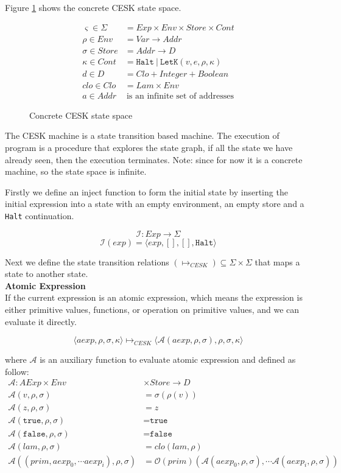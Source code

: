 \documentclass[paper=a4, fontsize=11pt]{scrartcl} %
\numberwithin{equation}{section} %
\numberwithin{figure}{section} %
\numberwithin{table}{section} %
\begin{document}
Figure \ref{fig:concretecesk} shows the concrete CESK state space.

\begin{figure}[h!]
\begin{align*}
\varsigma \in \Sigma & = Exp \times Env \times Store \times Cont \\
\rho \in Env & = Var \rightarrow Addr \\
\sigma \in Store & = Addr \rightarrow D \\
\kappa \in Cont & = \texttt{Halt} ~|~ \texttt{LetK}(v,e,\rho,\kappa) \\
d \in D & = Clo + Integer + Boolean \\
clo \in Clo & = Lam \times Env \\
a \in Addr & ~ \mbox{is an infinite set of addresses}
\end{align*}
\caption{Concrete CESK state space}
\label{fig:concretecesk}
\end{figure}

The CESK machine is a state transition based machine. The execution of program is a procedure that explores the state graph, if all the state we have already seen, then the execution terminates. Note: since for now it is a concrete machine, so the state space is infinite.

Firstly we define an inject function to form the initial state by inserting the initial expression into a state with an empty environment, an empty store and a \texttt{Halt} continuation.

$$ \mathcal{I} : Exp \rightarrow \Sigma $$
$$ \mathcal{I}(exp) = \langle exp, [], [], \texttt{Halt} \rangle $$

Next we define the state transition relations $(\longmapsto_{CESK}) \subseteq \Sigma \times \Sigma$ that maps a state to another state. \\

\textbf{Atomic Expression}\\
If the current expression is an atomic expression, which means the expression is either primitive values, functions, or operation on primitive values, and we can evaluate it directly.

$$ \langle aexp, \rho, \sigma, \kappa \rangle \longmapsto_{CESK} \langle \mathcal{A}(aexp, \rho, \sigma), \rho, \sigma, \kappa \rangle $$

where $\mathcal{A}$ is an auxiliary function to evaluate atomic expression and defined as follow:
\begin{align*}
\mathcal{A} : AExp \times Env & \times Store \rightarrow D \\
\mathcal{A}(v, \rho, \sigma) & = \sigma(\rho(v)) \\
\mathcal{A}(z, \rho, \sigma) & = z \\
\mathcal{A}(\texttt{true}, \rho, \sigma) & = \texttt{true} \\
\mathcal{A}(\texttt{false}, \rho, \sigma) & = \texttt{false} \\
\mathcal{A}(lam, \rho, \sigma) & = clo(lam, \rho)  \\
\mathcal{A}((prim, aexp_0, \cdots aexp_i), \rho, \sigma) & = \mathcal{O}(prim)(\mathcal{A}(aexp_0, \rho, \sigma), \cdots \mathcal{A}(aexp_i, \rho, \sigma))
\end{align*}
\end{document}

